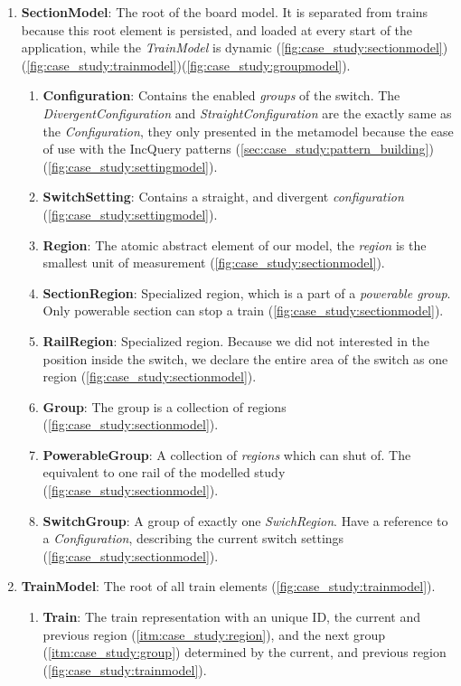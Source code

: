 \begin{enumerate}
	\item \textbf{SectionModel}: The root of the board model. It is separated from trains because this root element is persisted, and loaded at every start of the application, while the \emph{TrainModel} is dynamic (\cref{fig:case_study:sectionmodel})(\cref{fig:case_study:trainmodel})(\cref{fig:case_study:groupmodel}).
	\begin{enumerate}
		\item \textbf{Configuration}: Contains the enabled \emph{groups} of the switch. The \emph{DivergentConfiguration} and \emph{StraightConfiguration} are the exactly same as the \emph{Configuration}, they only presented in the metamodel because the ease of use with the IncQuery patterns (\cref{sec:case_study:pattern_building}) (\cref{fig:case_study:settingmodel}).
		\item \textbf{SwitchSetting}: Contains a straight, and divergent \emph{configuration} (\cref{fig:case_study:settingmodel}).
		\item \label{itm:case_study:region} \textbf{Region}: The atomic abstract element of our model, the \emph{region} is the smallest unit of measurement (\cref{fig:case_study:sectionmodel}).
		\item \textbf{SectionRegion}: Specialized region, which is a part of a \emph{powerable group}. Only powerable section can stop a train (\cref{fig:case_study:sectionmodel}). 
		\item \textbf{RailRegion}: Specialized region. Because we did not interested in the position inside the switch, we declare the entire area of the switch as one region (\cref{fig:case_study:sectionmodel}).
		\item \label{itm:case_study:group} \textbf{Group}: The group is a collection of regions (\cref{fig:case_study:sectionmodel}).
		\item \textbf{PowerableGroup}: A collection of \emph{regions} which can shut of. The equivalent to one rail of the modelled study (\cref{fig:case_study:sectionmodel}).
		\item \textbf{SwitchGroup}: A group of exactly one \emph{SwichRegion}. Have a reference to a \emph{Configuration}, describing the current switch settings (\cref{fig:case_study:sectionmodel}).
	\end{enumerate}
	\newpage
	\item \textbf{TrainModel}: The root of all train elements (\cref{fig:case_study:trainmodel}).
	\begin{enumerate}
		\item \textbf{Train}: The train representation with an unique ID, the current and previous region (\cref{itm:case_study:region}), and the next group (\cref{itm:case_study:group}) determined by the current, and previous region (\cref{fig:case_study:trainmodel}).
	\end{enumerate}
\end{enumerate}

